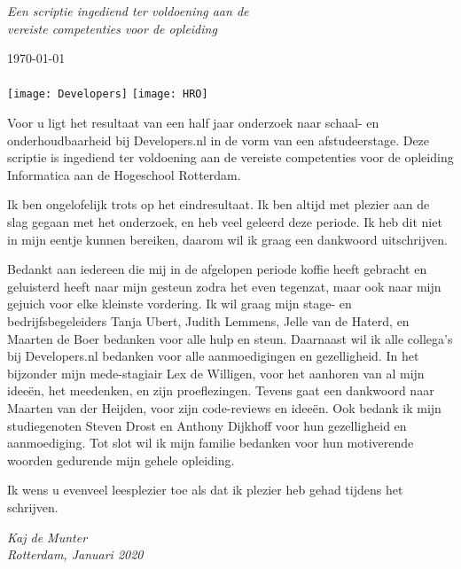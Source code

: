 \documentclass[
11pt, %
oneside, %
english, %
singlespacing, %
parskip, %
headsepline, %
]{formatting} %
\begin{document}
\begin{titlepage}
\begin{center}
		\vfill
		
		\large \textit{Een scriptie ingediend ter voldoening aan de\\ vereiste competenties voor de opleiding \degreename}\\[0.3cm]
		
		\deptname %
		
		\vfill
		
		{\large \today}\\[0.5cm] %
		{\Large \texttt{\versionnr}}\\[1cm]
		
		\texttt{[image: Developers]} \hspace{3cm}
		\texttt{[image: HRO]}

		\vfill
	\end{center}
\end{titlepage}


\begin{voorwoord}
	Voor u ligt het resultaat van een half jaar onderzoek naar schaal- en onderhoudbaarheid bij Developers.nl in de vorm van een afstudeerstage. Deze scriptie is ingediend ter voldoening aan de vereiste competenties voor de opleiding Informatica aan de Hogeschool Rotterdam.
	
	Ik ben ongelofelijk trots op het eindresultaat. Ik ben altijd met plezier aan de slag gegaan met het onderzoek, en heb veel geleerd deze periode. Ik heb dit niet in mijn eentje kunnen bereiken, daarom wil ik graag een dankwoord uitschrijven.
	
	Bedankt aan iedereen die mij in de afgelopen periode koffie heeft gebracht en geluisterd heeft naar mijn gesteun zodra het even tegenzat, maar ook naar mijn gejuich voor elke kleinste vordering. Ik wil graag mijn stage- en bedrijfsbegeleiders Tanja Ubert, Judith Lemmens, Jelle van de Haterd, en Maarten de Boer bedanken voor alle hulp en steun. Daarnaast wil ik alle collega's bij Developers.nl bedanken voor alle aanmoedigingen en gezelligheid. In het bijzonder mijn mede-stagiair Lex de Willigen, voor het aanhoren van al mijn ideeën, het meedenken, en zijn proeflezingen. Tevens gaat een dankwoord naar Maarten van der Heijden, voor zijn code-reviews en ideeën. Ook bedank ik mijn studiegenoten Steven Drost en Anthony Dijkhoff voor hun gezelligheid en aanmoediging. Tot slot wil ik mijn familie bedanken voor hun motiverende woorden gedurende mijn gehele opleiding.
	
	Ik wens u evenveel leesplezier toe als dat ik plezier heb gehad tijdens het schrijven.\\[0.5cm]

	\begin{flushright}
		\textit{Kaj de Munter\\
		Rotterdam, Januari 2020}
	\end{flushright}
\end{voorwoord}
\end{document}

